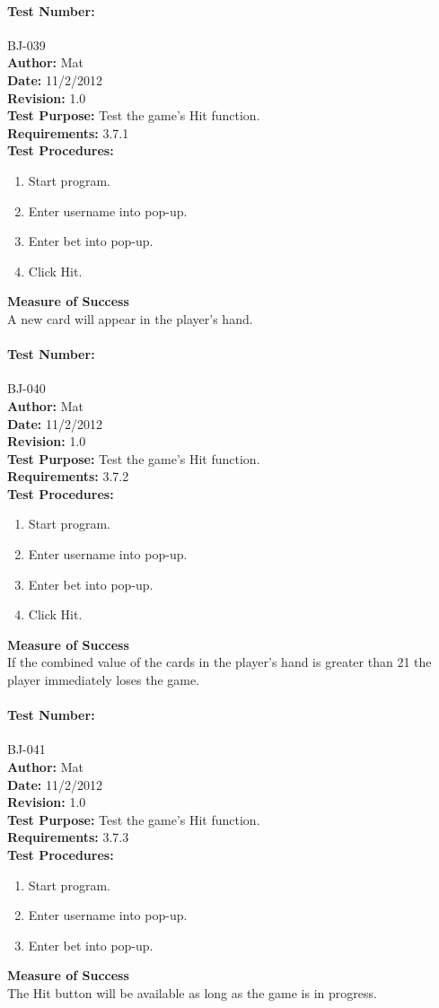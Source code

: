 \documentclass{article}
\begin{document}
\paragraph{Test Number:} BJ-039\\
\textbf{Author:} Mat\\
\textbf{Date:} 11/2/2012\\
\textbf{Revision:} 1.0\\
\textbf{Test Purpose:} Test the game's Hit function.\\
\textbf{Requirements:} 3.7.1 \\
\textbf{Test Procedures:} 
\begin{enumerate}
\item Start program.
\item Enter username into pop-up.
\item Enter bet into pop-up.
\item Click Hit.
\end{enumerate}
\textbf{Measure of Success}\\A new card will appear in the player's hand.
\paragraph{Test Number:} BJ-040\\
\textbf{Author:} Mat\\
\textbf{Date:} 11/2/2012\\
\textbf{Revision:} 1.0\\
\textbf{Test Purpose:} Test the game's Hit function.\\
\textbf{Requirements:} 3.7.2 \\
\textbf{Test Procedures:} 
\begin{enumerate}
\item Start program.
\item Enter username into pop-up.
\item Enter bet into pop-up.
\item Click Hit.
\end{enumerate}
\textbf{Measure of Success}\\If the combined value of the cards in the player's hand is greater than 21 the player immediately loses the game.
\paragraph{Test Number:} BJ-041\\
\textbf{Author:} Mat\\
\textbf{Date:} 11/2/2012\\
\textbf{Revision:} 1.0\\
\textbf{Test Purpose:} Test the game's Hit function.\\
\textbf{Requirements:} 3.7.3 \\
\textbf{Test Procedures:} 
\begin{enumerate}
\item Start program.
\item Enter username into pop-up.
\item Enter bet into pop-up.
\end{enumerate}
\textbf{Measure of Success}\\The Hit button will be available as long as the game is in progress.
\end{document}

